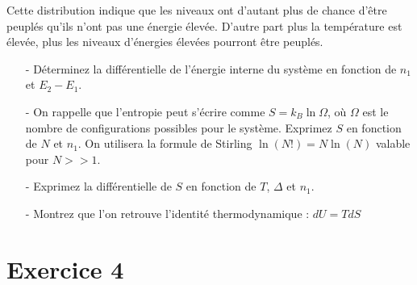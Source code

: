 \documentclass{report}
\begin{document}
Cette distribution indique que les niveaux ont d'autant plus de chance d'être peuplés qu'ils n'ont pas une énergie élevée. D'autre part plus la température est élevée, plus les niveaux d'énergies élevées pourront être peuplés. 

\begin{itemize}
\item[-]Déterminez la différentielle de l'énergie interne du système en fonction de $n_{1}$ et $E_{2}-E_{1}$.
\item[-]On rappelle que l'entropie peut s'écrire comme $S=k_B\ln\Omega$, où $\Omega$ est le nombre de configurations possibles pour le système. Exprimez $S$ en fonction de $N$ et $n_1$. On utilisera la formule de Stirling $\ln (N!)=N \ln (N)$ valable pour $N>>1$.
\item[-] Exprimez la différentielle de $S$ en fonction de $T$, $\Delta$ et $n_1$.
\item[-] Montrez que l'on retrouve l'identité thermodynamique : $dU = TdS$
\end{itemize}

\newpage

\section*{Exercice 4}
\end{document}
